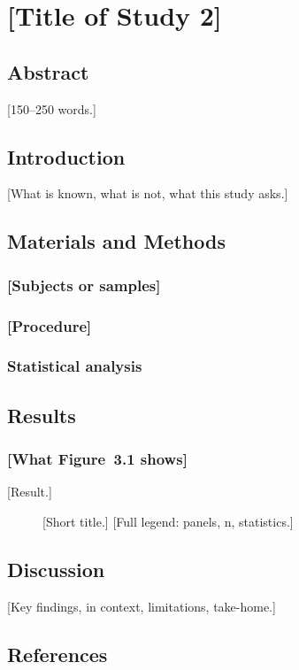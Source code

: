 \chapter{[Title of Study 2]}
\label{ch:study2}

\section{Abstract}
\label{sec:abstract_3}
[150–250 words.]

\section{Introduction}
\label{sec:intro_3}
[What is known, what is not, what this study asks.]

\section{Materials and Methods}
\label{sec:methods_3}
\subsection{[Subjects or samples]}
\subsection{[Procedure]}
\subsection{Statistical analysis}

\section{Results}
\label{sec:results_3}
\subsection{[What Figure~3.1 shows]}
[Result.]

\begin{figure}[tbp]
  \centering
  \caption{[Short title.] [Full legend: panels, n, statistics.]}
  \label{fig:study2-fig1}
\end{figure}

\section{Discussion}
\label{sec:discussion_3}
[Key findings, in context, limitations, take-home.]

\section{References}
\label{sec:ref_3}
